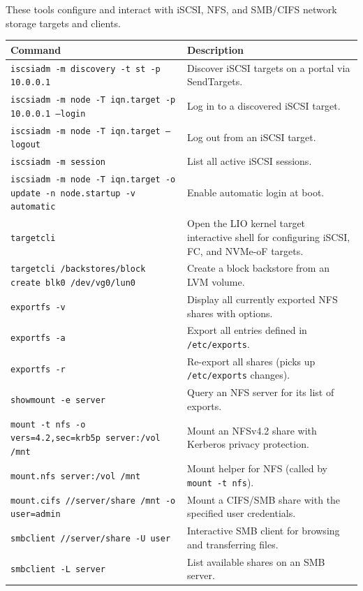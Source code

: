 These tools configure and interact with iSCSI, NFS, and SMB/CIFS network
storage targets and clients.

\begin{longtable}{p{4cm} p{8cm}}
\toprule
\textbf{Command} & \textbf{Description} \\
\midrule
\endhead
\texttt{iscsiadm -m discovery -t st -p 10.0.0.1} & Discover iSCSI targets on a portal via SendTargets. \\
\texttt{iscsiadm -m node -T iqn.target -p 10.0.0.1 --login} & Log in to a discovered iSCSI target. \\
\texttt{iscsiadm -m node -T iqn.target --logout} & Log out from an iSCSI target. \\
\texttt{iscsiadm -m session} & List all active iSCSI sessions. \\
\texttt{iscsiadm -m node -T iqn.target -o update -n node.startup -v automatic} & Enable automatic login at boot. \\
\texttt{targetcli} & Open the LIO kernel target interactive shell for configuring iSCSI, FC, and NVMe-oF targets. \\
\texttt{targetcli /backstores/block create blk0 /dev/vg0/lun0} & Create a block backstore from an LVM volume. \\
\texttt{exportfs -v} & Display all currently exported NFS shares with options. \\
\texttt{exportfs -a} & Export all entries defined in \texttt{/etc/exports}. \\
\texttt{exportfs -r} & Re-export all shares (picks up \texttt{/etc/exports} changes). \\
\texttt{showmount -e server} & Query an NFS server for its list of exports. \\
\texttt{mount -t nfs -o vers=4.2,sec=krb5p server:/vol /mnt} & Mount an NFSv4.2 share with Kerberos privacy protection. \\
\texttt{mount.nfs server:/vol /mnt} & Mount helper for NFS (called by \texttt{mount -t nfs}). \\
\texttt{mount.cifs //server/share /mnt -o user=admin} & Mount a CIFS/SMB share with the specified user credentials. \\
\texttt{smbclient //server/share -U user} & Interactive SMB client for browsing and transferring files. \\
\texttt{smbclient -L server} & List available shares on an SMB server. \\
\bottomrule
\end{longtable}


